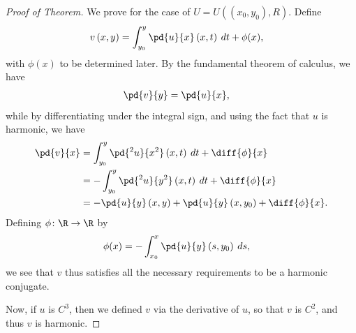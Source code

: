 \documentclass[10pt]{mypackage}
\begin{document}
\begin{proof}[Proof of Theorem]
  We prove for the case of $U = U\left( \left( x_0,y_0 \right),R \right)$. Define
  \begin{align*}
    v\left( x,y \right) &= \int_{y_0}^{y} \pd{u}{x}\left( x,t \right)\:dt + \phi(x),
  \end{align*}
  with $\phi(x)$ to be determined later. By the fundamental theorem of calculus, we have
  \begin{align*}
    \pd{v}{y} &= \pd{u}{x},
  \end{align*}
  while by differentiating under the integral sign, and using the fact that $u$ is harmonic, we have
  \begin{align*}
    \pd{v}{x} &= \int_{y_0}^{y} \pd{^2u}{x^2}\left( x,t \right)\:dt + \diff{\phi}{x}\\
              &= - \int_{y_0}^{y} \pd{^2u}{y^2}\left( x,t \right)\:dt + \diff{\phi}{x}\\
              &= - \pd{u}{y}\left( x,y \right) + \pd{u}{y}\left( x,y_0 \right) + \diff{\phi}{x}.
  \end{align*}
  Defining $\phi\colon \R\rightarrow \R$ by
  \begin{align*}
    \phi(x) &= -\int_{x_0}^{x} \pd{u}{y}\left( s,y_0 \right)\:ds,
  \end{align*}
  we see that $v$ thus satisfies all the necessary requirements to be a harmonic conjugate.%

  Now, if $u$ is $C^{3}$, then we defined $v$ via the derivative of $u$, so that $v$ is $C^{2}$, and thus $v$ is harmonic.
\end{proof}
\end{document}
